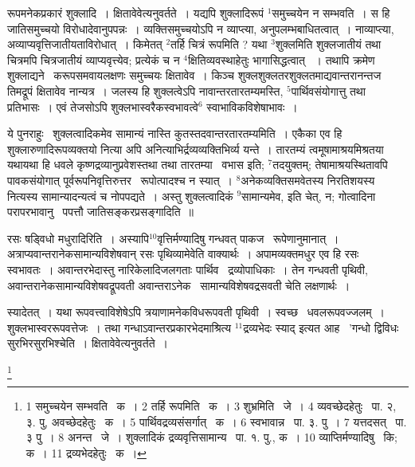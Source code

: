 \documentclass[11pt, openany]{book}
\newcommand\blfootnote[1]{%
 \begingroup
 \renewcommand\thefootnote{}\footnote{#1}%
 \addtocounter{footnote}{-1}%
 \endgroup
}
\begin{document}
\newpage
{\knu रूपमनेकप्रकारं शुक्लादि~।} क्षितावेवेत्यनुवर्तते~। यद्यपि शुक्लादिरूपं ${}^1$समुच्चयेन न सम्भवति~। स हि जातिसमुच्चयो विरोधादेवानुपपन्नः~। व्यक्तिसमुच्चयोऽपि न व्याप्त्या, अनुपलम्भबाधितत्वात्~। नाव्याप्त्या, अव्याप्यवृत्तिजातीयताविरोधात्~। किमेतत् ${}^2$तर्हि चित्रं रूपमिति ? यथा ${}^3$शुक्लमिति शुक्लजातीयं तथा चित्रमपि चित्रजातीयं व्याप्यवृत्त्येव; प्रत्येकं च न ${}^4$क्षितिव्यवस्थाहेतुः भागासिद्धत्वात् ~। तथापि क्रमेण शुक्लाद्यने \textendash\ करूपसमवायलक्षणः समुच्चयः क्षितावेव~। किञ्च शुक्लशुक्लतरशुक्लतमाद्यवान्तरानन्तज तिमद्रूपं क्षितावेव नान्यत्र~। जलस्य हि शुक्लत्वेऽपि नावान्तरतारतम्यमस्ति, ${}^5$पार्थिवसंयोगात्तु तथा प्रतिभासः~। एवं तेजसोऽपि शुक्लभास्वरैकस्वभावत्वे$^6$ स्वाभाविकविशेषाभावः~।

ये पुनराहुः \textendash\ शुक्लत्वादिकमेव सामान्यं नास्ति कुतस्तदवान्तरतारतम्यमिति~। एकैका एव हि शुक्लारुणादिरूपव्यक्तयो नित्या अपि अनित्याभिर्द्रव्यव्यक्तिभिर्व्य यन्ते~। तारतम्यं त्वमूषामाश्रयमिश्रतया यथायथा हि धवले कृष्णद्रव्यानुप्रवेशस्तथा तथा तारतम्या \textendash\ वभास इति; ${}^7$तदयुक्तम्; तेषामाश्रयस्थितावपि पावकसंयोगात् पूर्वरूपनिवृत्तिरुत्तर \textendash\ रूपोत्पादश्च न स्यात्~। ${}^8$अनेकव्यक्तिसमवेतस्य निरतिशयस्य नित्यस्य सामान्यादन्यत्वं च नोपपद्यते~। अस्तु शुक्लत्वादिकं ${}^9$सामान्यमेव, इति चेत्, न; गोत्वादिना परापरभावानु \textendash\ पपत्तौ जातिसङ्करप्रसङ्गादिति~॥

{\knu रसः षड्विधो मधुरादि}रिति~। अस्यापि${}^10$वृत्तिर्मण्यादिषु गन्धवत् पाकज  \textendash\ रूपेणानुमानात्~। अत्राप्यवान्तरानेकसामान्यविशेषवान् रसः पृथिव्यामेवेति वाक्यार्थः~। अपामव्यक्तमधुर एव हि रसः स्वभावतः~। अवान्तरभेदास्तु नारिकेलादिजलगताः पार्थिव \textendash\ द्रव्योपाधिकाः~। तेन गन्धवती पृथिवी, अवान्तरानेकसामान्यविशेषवद्रूपवती अवान्तराऽनेक \textendash\ सामान्यविशेषवद्रसवती चेति लक्षणार्थः~।

स्यादेतत्~। यथा रूपवत्त्वाविशेषेऽपि त्रयाणामनेकविधरूपवती पृथिवी~। स्वच्छ  \textendash\ धवलरूपवज्जलम्~। शुक्लभास्वररूपवत्तेजः~। तथा गन्धाऽवान्तरप्रकारभेदमाश्रित्य ${}^11$द्रव्यभेदः स्याद् इत्यत आह \textendash\ 'गन्धो द्विविधः सुरभिरसुरभिश्चेति~। क्षितावेवेत्यनुवर्तते~।

\blfootnote{1 समुच्चयेन सम्भवति  \textendash\ क~। 2 तर्हि रूपमिति  \textendash\ क~। 3 शुभ्रमिति  \textendash\ जे~। 4 व्यवच्छेदहेतुः  \textendash\ पा. २, ३. पु, अवच्छेदहेतुः \textendash\ क~। 5 पार्थिवद्रव्यसंसर्गात्  \textendash\ क~। 6 स्वभावान्न  \textendash\ पा. ३. पु~। 7 यत्तदसत्  \textendash\ पा. ३ पु~। 8 अनन्त  \textendash\ जे~। शुक्लादिकं द्रव्यवृत्तिसामान्य  \textendash\ पा. १. पु., क~। 10 व्याप्तिर्मण्यादिषु  \textendash\ कि; क~। 11 द्रव्यभेदहेतुः  \textendash\ क~।}
\end{document}
